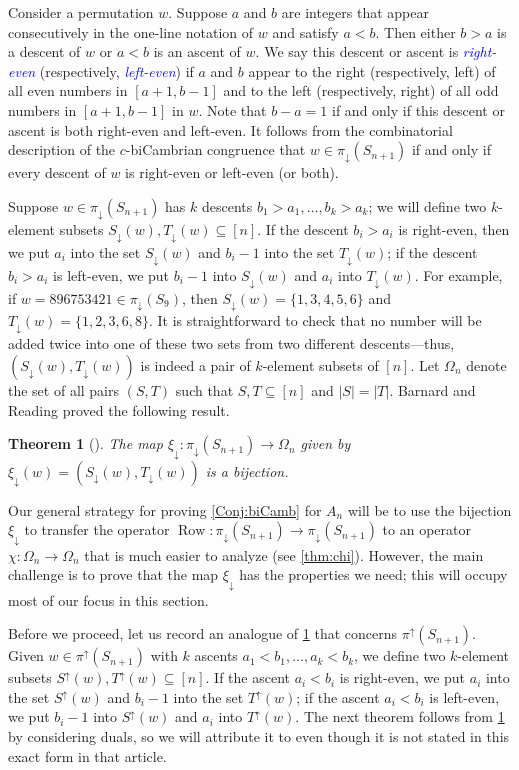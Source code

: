 \documentclass[11pt]{amsart}
\newtheorem{theorem}{Theorem}[section]
\theoremstyle{definition}
\DeclareMathOperator{\row}{Row}
\newcommand{\dfn}[1]{\textcolor{blue}{\emph{#1}}}
\begin{document}
Consider a permutation $w$. Suppose $a$ and $b$ are integers that appear consecutively in the one-line notation of $w$ and satisfy $a<b$. Then either $b>a$ is a descent of $w$ or $a<b$ is an ascent of $w$. We say this descent or ascent is \dfn{right-even} (respectively, \dfn{left-even}) if $a$ and $b$ appear to the right (respectively, left) of all even numbers in $[a+1,b-1]$ and to the left (respectively, right) of all odd numbers in $[a+1,b-1]$ in $w$. Note that $b-a=1$ if and only if this descent or ascent is both right-even and left-even. It follows from the combinatorial description of the $c$-biCambrian congruence that $w\in\pi_\downarrow(S_{n+1})$ if and only if every descent of $w$ is right-even or left-even (or both).

Suppose $w\in\pi_\downarrow(S_{n+1})$ has $k$ descents $b_1>a_1,\ldots,b_k>a_k$; we will define two $k$-element subsets $S_\downarrow(w),T_\downarrow(w)\subseteq[n]$. If the descent $b_i>a_i$ is right-even, then we put $a_i$ into the set $S_\downarrow(w)$ and $b_i-1$ into the set $T_\downarrow(w)$; if the descent $b_i>a_i$ is left-even, we put $b_i-1$ into $S_\downarrow(w)$ and $a_i$ into $T_\downarrow(w)$. For example, if $w=896753421\in\pi_\downarrow(S_9)$, then $S_\downarrow(w)=\{1,3,4,5,6\}$ and $T_\downarrow(w)=\{1,2,3,6,8\}$. It is straightforward to check that no number will be added twice into one of these two sets from two different descents---thus, $(S_\downarrow(w),T_\downarrow(w))$ is indeed a pair of $k$-element subsets of $[n]$. Let $\Omega_n$ denote the set of all pairs $(S,T)$ such that $S,T\subseteq[n]$ and $|S|=|T|$. Barnard and Reading proved the following result.

\begin{theorem}[{\cite[Theorem~3.8]{BarnardReading}}]\label{thm:STbijectionpidown}
The map $\xi_\downarrow\colon\pi_\downarrow(S_{n+1})\to\Omega_n$ given by $\xi_\downarrow(w)=(S_\downarrow(w),T_\downarrow(w))$ is a bijection. 
\end{theorem}

Our general strategy for proving \cref{Conj:biCamb} for $A_n$ will be to use the bijection $\xi_\downarrow$ to transfer the operator $\row\colon\pi_\downarrow(S_{n+1})\to\pi_{\downarrow}(S_{n+1})$ to an operator $\chi\colon\Omega_n\to\Omega_n$ that is much easier to analyze (see \cref{thm:chi}). However, the main challenge is to prove that the map $\xi_\downarrow$ has the properties we need; this will occupy most of our focus in this section.  

Before we proceed, let us record an analogue of \cref{thm:STbijectionpidown} that concerns $\pi^\uparrow(S_{n+1})$. Given $w\in \pi^\uparrow(S_{n+1})$ with $k$ ascents $a_1<b_1, \ldots , a_k<b_k$, we define two $k$-element subsets $S^\uparrow(w),T^\uparrow(w)\subseteq[n]$. If the ascent $a_i<b_i$ is right-even, we put $a_i$ into the set $S^\uparrow(w)$ and $b_i-1$ into the set $T^\uparrow(w)$; if the ascent $a_i<b_i$ is left-even, we put $b_i-1$ into $S^\uparrow(w)$ and $a_i$ into $T^\uparrow(w)$. The next theorem follows from \cref{thm:STbijectionpidown} by considering duals, so we will attribute it to \cite{BarnardReading} even though it is not stated in this exact form in that article. 
\end{document}
